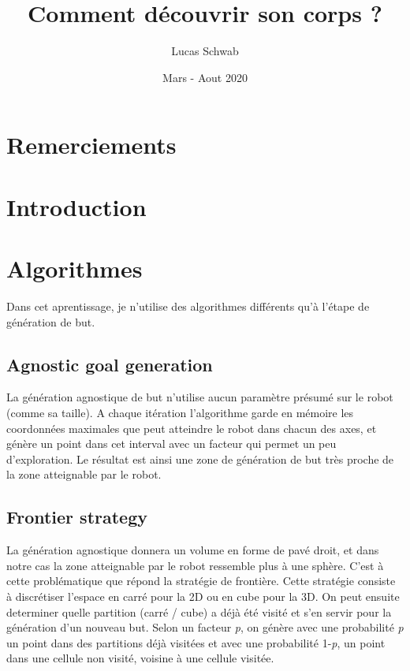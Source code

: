 \documentclass{article}
\title{Comment découvrir son corps ?}
\author{Lucas Schwab}
\date{Mars - Aout 2020}
\begin{document}
\maketitle

\tableofcontents

\section*{Remerciements}

\section*{Introduction}

\section*{Algorithmes}

Dans cet aprentissage, je n'utilise des algorithmes différents qu'à l'étape de génération de but.

\subsection*{Agnostic goal generation}

La génération agnostique de but n'utilise aucun paramètre présumé sur le robot (comme sa taille). A chaque itération l'algorithme garde en mémoire les coordonnées maximales que peut atteindre le robot dans chacun des axes, et génère un point dans cet interval avec un facteur qui permet un peu d'exploration. Le résultat est ainsi une zone de génération de but très proche de la zone atteignable par le robot.

\subsection*{Frontier strategy}

La génération agnostique donnera un volume en forme de pavé droit, et dans notre cas la zone atteignable par le robot ressemble plus à une sphère. C'est à cette problématique que répond la stratégie de frontière. Cette stratégie consiste à discrétiser l'espace en carré pour la 2D ou en cube pour la 3D. On peut ensuite determiner quelle partition (carré / cube)  a déjà été visité et s'en servir pour la génération d'un nouveau but. Selon un facteur \emph{p}, on génère avec une probabilité \emph{p} un point dans des partitions déjà visitées et avec une probabilité 1-\emph{p}, un point dans une cellule non visité, voisine à une cellule visitée. 
\end{document}
